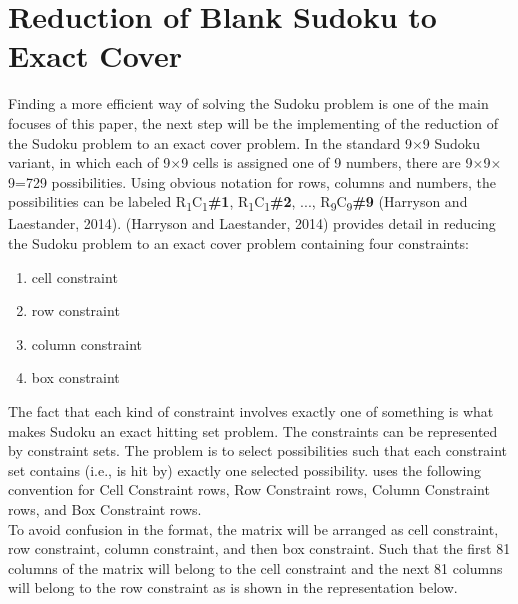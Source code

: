 \documentclass[a4paper,oneside,11pt]{report}
\begin{document}
\section{Reduction of Blank Sudoku to Exact Cover}
Finding a more efficient way of solving the Sudoku problem is one of the main focuses of this paper, the next step will be the implementing of the reduction of the Sudoku problem to an exact cover problem. In the standard 9$\times$9 Sudoku variant, in which each of 9$\times$9 cells is assigned one of 9 numbers, there are 9$\times$9$\times$9=729 possibilities. Using obvious notation for rows, columns and numbers, the possibilities can be labeled R\textsubscript{1}C\textsubscript{1}\textbf{\#1}, R\textsubscript{1}C\textsubscript{1}\textbf{\#2}, ..., R\textsubscript{9}C\textsubscript{9}\textbf{\#9} (Harryson and Laestander, 2014). (Harryson and Laestander, 2014) provides detail in reducing the Sudoku problem to an exact cover problem containing four constraints:
\begin{enumerate}[label=\alph*.]
\item cell constraint
\vspace{-0.5cm}
\item row constraint
\vspace{-0.5cm}
\item column constraint
\vspace{-0.5cm}
\item box constraint
\end{enumerate}
The fact that each kind of constraint involves exactly one of something is what makes Sudoku an exact hitting set problem. The constraints can be represented by constraint sets. The problem is to select possibilities such that each constraint set contains (i.e., is hit by) exactly one selected possibility. \cite{Harrysson} uses the following convention for Cell Constraint rows, Row Constraint rows, Column Constraint rows, and Box Constraint rows.\\

\noindent To avoid confusion in the format, the matrix will be arranged as cell constraint, row constraint, column constraint, and then box constraint. Such that the first 81 columns of the matrix will belong to the cell constraint and the next 81 columns will belong to the row constraint as is shown in the representation below.\\
\end{document}
